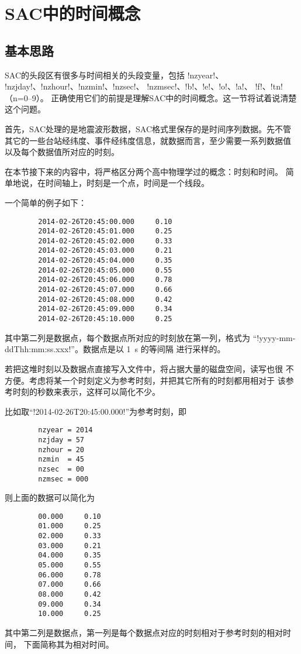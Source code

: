\section{SAC中的时间概念}
\label{sec:sac-time}

\subsection{基本思路}
SAC的头段区有很多与时间相关的头段变量，包括 !nzyear!、
!nzjday!、!nzhour!、!nzmin!、!nzsec!、
!nzmsec!、!b!、!e!、!o!、!a!、
!f!、!tn!（n=0--9）。
正确使用它们的前提是理解SAC中的时间概念。这一节将试着说清楚这个问题。

首先，SAC处理的是地震波形数据，SAC格式里保存的是时间序列数据。先不管
其它的一些台站经纬度、事件经纬度信息，就数据而言，至少需要一系列数据值
以及每个数据值所对应的时刻。

在本节接下来的内容中，将严格区分两个高中物理学过的概念：时刻和时间。
简单地说，在时间轴上，时刻是一个点，时间是一个线段。

一个简单的例子如下：
\begin{verbatim}
        2014-02-26T20:45:00.000     0.10
        2014-02-26T20:45:01.000     0.25
        2014-02-26T20:45:02.000     0.33
        2014-02-26T20:45:03.000     0.21
        2014-02-26T20:45:04.000     0.35
        2014-02-26T20:45:05.000     0.55
        2014-02-26T20:45:06.000     0.78
        2014-02-26T20:45:07.000     0.66
        2014-02-26T20:45:08.000     0.42
        2014-02-26T20:45:09.000     0.34
        2014-02-26T20:45:10.000     0.25
\end{verbatim}
其中第二列是数据点，每个数据点所对应的时刻放在第一列，格式为
``!yyyy-mm-ddThh:mm:ss.xxx!''。数据点是以 \SI{1}{\s} 的等间隔
进行采样的。

若把这堆时刻以及数据点直接写入文件中，将占据大量的磁盘空间，读写也很
不方便。考虑将某一个时刻定义为参考时刻，并把其它所有的时刻都用相对于
该参考时刻的秒数来表示，这样可以简化不少。

比如取``!2014-02-26T20:45:00.000!''为参考时刻，即
\begin{verbatim}
        nzyear = 2014
        nzjday = 57
        nzhour = 20
        nzmin  = 45
        nzsec  = 00
        nzmsec = 000
\end{verbatim}
则上面的数据可以简化为
\begin{verbatim}
        00.000     0.10
        01.000     0.25
        02.000     0.33
        03.000     0.21
        04.000     0.35
        05.000     0.55
        06.000     0.78
        07.000     0.66
        08.000     0.42
        09.000     0.34
        10.000     0.25
\end{verbatim}
其中第二列是数据点，第一列是每个数据点对应的时刻相对于参考时刻的相对时间，
下面简称其为相对时间。

